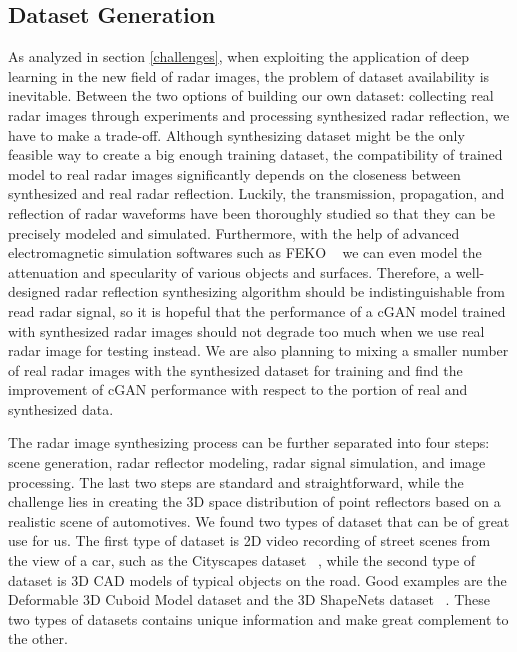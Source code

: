 \subsection{Dataset Generation} \label{dataset}
As analyzed in section \ref{challenges}, when exploiting the application of deep learning in the new field of radar images, the problem of dataset availability is inevitable. Between the two options of building our own dataset: collecting real radar images through experiments and processing synthesized radar reflection, we have to make a trade-off. Although synthesizing dataset might be the only feasible way to create a big enough training dataset, the compatibility of trained model to real radar images significantly depends on the closeness between synthesized  and real radar reflection. Luckily, the transmission, propagation, and reflection of radar waveforms have been thoroughly studied so that they can be precisely modeled and simulated. Furthermore, with the help of advanced electromagnetic simulation softwares such as FEKO ~\cite{feko} we can even model the attenuation and specularity of various objects and surfaces. Therefore, a well-designed radar reflection synthesizing algorithm should be indistinguishable from read radar signal, so it is hopeful that the performance of a cGAN model trained with synthesized radar images should not degrade too much when we use real radar image for testing instead. We are also planning to mixing a smaller number of real radar images with the synthesized dataset for training and find the improvement of cGAN performance with respect to the portion of real and synthesized data.  

The radar image synthesizing process can be further separated into four steps: scene generation, radar reflector modeling, radar signal simulation, and image processing. The last two steps are standard and straightforward, while the challenge lies in creating the 3D space distribution of point reflectors based on a realistic scene of automotives. We found two types of dataset that can be of great use for us. The first type of dataset is 2D video recording of street scenes from the view of a car, such as the Cityscapes dataset ~\cite{cityscapes}, while the second type of dataset is 3D CAD models of typical objects on the road. Good examples are the Deformable 3D Cuboid Model dataset and the 3D ShapeNets dataset ~\cite{3Ddata, shapenets}. These two types of datasets contains unique information and make great complement to the other.

